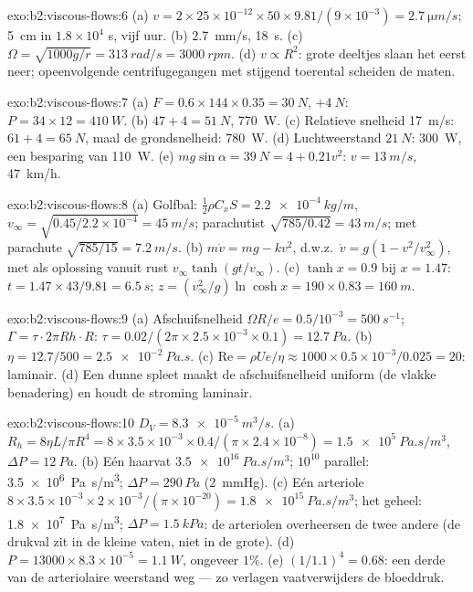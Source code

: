 \begin{solution}{exo:b2:viscous-flows:6}
(a)
$v = 2 \times 25 \times 10^{-12} \times 50 \times 9.81/(9 \times 10^{-3}) = \qty{2.7}{\micro m/s}$;
\qty{5}{cm} in $1.8 \times 10^4$ s, vijf uur. (b) \qty{2.7}{mm/s},
\qty{18}{s}. (c)
$\Omega = \sqrt{1000g/r} = \qty{313}{rad/s} = \qty{3000}{rpm}$. (d)
$v \propto R^2$: grote deeltjes slaan het eerst neer; opeenvolgende
centrifugegangen met stijgend toerental scheiden de maten.
\end{solution}

\begin{solution}{exo:b2:viscous-flows:7}
(a) $F = 0.6 \times 144 \times 0.35 = \qty{30}{N}$, $+\qty{4}{N}$:
$P = 34 \times 12 =
\qty{410}{W}$. (b) $47 + 4 = \qty{51}{N}$, \qty{770}{W}.
(c) Relatieve snelheid \qty{17}{m/s}: $61 + 4 = \qty{65}{N}$, maal de
grondsnelheid: \qty{780}{W}. (d) Luchtweerstand $\qty{21}{N}$: \qty{300}{W},
een besparing van \qty{110}{W}. (e)
$mg\sin\alpha = \qty{39}{N} =
4 + 0.21v^2$: $v = \qty{13}{m/s}$,
\qty{47}{km/h}.
\end{solution}

\begin{solution}{exo:b2:viscous-flows:8}
(a) Golfbal: $\tfrac12\rho C_xS = \qty{2.2e-4}{kg/m}$,
$v_\infty = \sqrt{0.45/2.2 \times 10^{-4}}
= \qty{45}{m/s}$; parachutist
$\sqrt{785/0.42} = \qty{43}{m/s}$; met parachute
$\sqrt{785/15} =
\qty{7.2}{m/s}$. (b) $m\dot v = mg - kv^2$, d.w.z.\
$\dot v = g(1 - v^2/v_\infty^2)$, met als oplossing vanuit rust
$v_\infty\tanh(gt/v_\infty)$. (c) $\tanh x = 0.9$ bij $x = 1.47$:
$t = 1.47 \times 43/9.81 = \qty{6.5}{s}$;
$z = (v_\infty^2/g)\ln\cosh x =
190 \times 0.83 = \qty{160}{m}$.
\end{solution}

\begin{solution}{exo:b2:viscous-flows:9}
(a) Afschuifsnelheid $\Omega R/e = 0.5/10^{-3} = \qty{500}{s^{-1}}$;
$\Gamma = \tau\cdot2\pi Rh
\cdot R$:
$\tau = 0.02/(2\pi \times 2.5 \times 10^{-3} \times 0.1) = \qty{12.7}{Pa}$.
(b) $\eta
= 12.7/500 = \qty{2.5e-2}{Pa.s}$. (c)
$\mathrm{Re} = \rho Ue/\eta \approx 1000 \times 0.5 \times
10^{-3}/0.025 = 20$:
laminair. (d) Een dunne spleet maakt de afschuifsnelheid uniform (de vlakke
benadering) en houdt de stroming laminair.
\end{solution}

\begin{solution}{exo:b2:viscous-flows:10}
$D_V = \qty{8.3e-5}{m^3/s}$. (a)
$R_h = 8\eta L/\pi R^4 = 8 \times 3.5 \times 10^{-3} \times
0.4/(\pi \times 2.4 \times 10^{-8}) = \qty{1.5e5}{Pa.s/m^3}$,
$\Delta P = \qty{12}{Pa}$. (b) Eén haarvat $\qty{3.5e16}{Pa.s/m^3}$;
$10^{10}$ parallel: \qty{3.5e6}{Pa.s/m^3}; $\Delta P = \qty{290}{Pa}$
(\qty{2}{mmHg}). (c) Eén arteriole
$8 \times 3.5 \times 10^{-3}
\times 2 \times 10^{-3}/(\pi \times 10^{-20}) = \qty{1.8e15}{Pa.s/m^3}$;
het geheel: \qty{1.8e7}{Pa.s/m^3}; $\Delta P = \qty{1.5}{kPa}$: de
arteriolen overheersen de twee andere (de drukval zit in de kleine vaten,
niet in de grote). (d) $P = 13000 \times 8.3 \times 10^{-5} = \qty{1.1}{W}$,
ongeveer $1\%$. (e) $(1/1.1)^4 = 0.68$: een derde van de arteriolaire
weerstand weg --- zo verlagen vaatverwijders de bloeddruk.
\end{solution}

